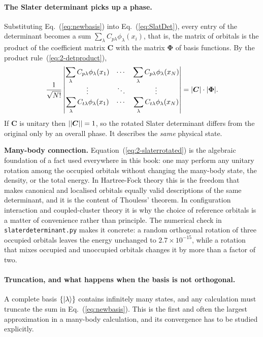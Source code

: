 \paragraph{The Slater determinant picks up a phase.}
Substituting Eq.~(\ref{eq:newbasis}) into Eq.~(\ref{eq:SlatDet}), every entry
of the determinant becomes a sum $\sum_{\lambda}C_{p\lambda}\phi_{\lambda}(x_i)$,
that is, the matrix of orbitals is the product of the coefficient matrix
$\bm{C}$ with the matrix $\bm{\Phi}$ of basis functions.  By the product
rule~(\ref{eq:2-detproduct}),
\begin{equation}
  \frac{1}{\sqrt{N!}}
  \begin{vmatrix}
    \displaystyle\sum_\lambda C_{p\lambda}\phi_\lambda(x_1) & \cdots &
    \displaystyle\sum_\lambda C_{p\lambda}\phi_\lambda(x_N)\\
    \vdots & \ddots & \vdots\\
    \displaystyle\sum_\lambda C_{t\lambda}\phi_\lambda(x_1) & \cdots &
    \displaystyle\sum_\lambda C_{t\lambda}\phi_\lambda(x_N)
  \end{vmatrix}
  = {|\boldsymbol{C}|}\cdot{|\boldsymbol{\Phi}|} .
  \label{eq:2-slaterrotated}
\end{equation}
If $\bm{C}$ is unitary then $|{|\boldsymbol{C}|}|=1$, so the rotated Slater determinant
differs from the original only by an overall phase.  It describes the
\emph{same} physical state.

\begin{notebox}
\textbf{Many-body connection.} Equation~(\ref{eq:2-slaterrotated}) is the
algebraic foundation of a fact used everywhere in this book: one may perform
any unitary rotation among the occupied orbitals without changing the
many-body state, the density, or the total energy.  In Hartree-Fock theory
this is the freedom that makes canonical and localised orbitals equally valid
descriptions of the same determinant, and it is the content of Thouless'
theorem.  In configuration interaction and coupled-cluster theory it is why
the choice of reference orbitals is a matter of convenience rather than
principle.  The numerical check in \texttt{slaterdeterminant.py} makes it
concrete: a random orthogonal rotation of three occupied orbitals leaves the
energy unchanged to $2.7\times10^{-15}$, while a rotation that mixes occupied
and unoccupied orbitals changes it by more than a factor of two.
\end{notebox}

\paragraph{Truncation, and what happens when the basis is not orthogonal.}
A complete basis $\{\vert \lambda \rangle\}$ contains infinitely many states, and any
calculation must truncate the sum in Eq.~(\ref{eq:newbasis}).  This is the
first and often the largest approximation in a many-body calculation, and its
convergence has to be studied explicitly.

